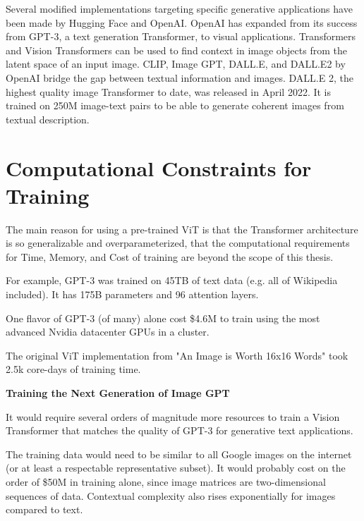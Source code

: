 Several modified implementations targeting specific generative applications have been made by Hugging Face and OpenAI.
OpenAI has expanded from its success from GPT-3, a text generation Transformer, to visual applications.
Transformers and Vision Transformers can be used to find context in image objects from the latent space of an input image.
CLIP, Image GPT, DALL.E, and DALL.E2 by OpenAI bridge the gap between textual information and images.
DALL.E 2, the highest quality image Transformer to date, was released in April 2022.
It is trained on 250M image-text pairs to be able to generate coherent images from textual description. \citep{Dalle2}



\section{Computational Constraints for Training}


The main reason for using a pre-trained ViT is that the Transformer architecture is so generalizable and 
overparameterized, that the computational requirements for Time, Memory, and Cost of training 
are beyond the scope of this thesis. 


For example, GPT-3 was trained on 45TB of text data (e.g. all of Wikipedia included). It has 175B parameters and 96 attention layers. \citep{GPT3}

One flavor of GPT-3 (of many) alone cost \$4.6M to train using the most advanced Nvidia datacenter GPUs in a cluster.

The original ViT implementation from "An Image is Worth 16x16 Words" took 2.5k core-days of training time. \citep{dosovitskiy2020vit} 

\vspace{5mm}

\textbf{Training the Next Generation of Image GPT}

It would require several orders of magnitude more resources to train a Vision Transformer that matches the quality of GPT-3 
for generative text applications.

The training data would need to be similar to all Google images on the internet (or at least a respectable representative subset).
It would probably cost on the order of \$50M in training alone, since image matrices are two-dimensional sequences of data.
Contextual complexity also rises exponentially for images compared to text.










